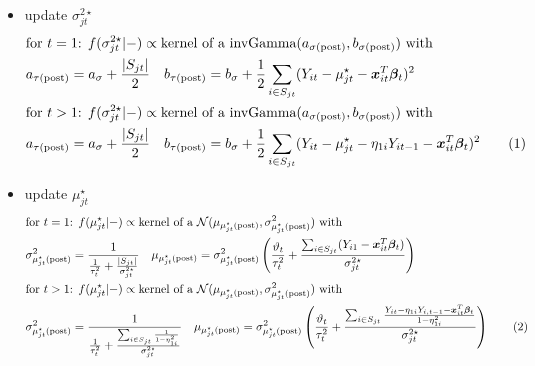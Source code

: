 \documentclass[12pt,	%
	a4paper,		%
	twoside,		%
	openright,		%
	titlepage,%
	]{book}
\newcommand\numberthis{\addtocounter{equation}{1}\tag{\theequation}}
\theoremstyle{definition}
\begin{document}
\begin{itemize}

\item update $\sigma^{2\star}_{jt}$
\begin{align*}
&\text{for $t=1$} \text{: }
  f(\sigma^{2\star}_{jt}|-)\propto \text{kernel of a $\invgamma(a_{\postp{\sigma}}, b_{\postp{\sigma}})$ with}\\
&a_{\postp{\tau}}= a_\sigma + \frac{|S_{jt}|}{2} \quad
%
b_{\postp{\tau}}=b_\sigma + \frac{1}{2}\sum_{i \in S_{jt}}(Y_{it}-\mu^\star_{jt}-\vec{x}_{it}^T\vec{\beta}_t)^2 \\
&\text{for $t>1$}\text{: }
  f(\sigma^{2\star}_{jt}|-) \propto \text{kernel of a $\invgamma(a_{\postp{\sigma}}, b_{\postp{\sigma}})$ with}\\
&a_{\postp{\tau}}= a_\sigma + \frac{|S_{jt}|}{2} \quad
%
b_{\postp{\tau}}=b_\sigma + \frac{1}{2}\sum_{i \in S_{jt}}(Y_{it}-\mu^\star_{jt}-\eta_{1i}Y_{it-1}-\vec{x}_{it}^T\vec{\beta}_t)^2 
 \numberthis \label{update sigma2h}
\end{align*}


\item update $\mu^\star_{jt}$
\begin{align*}
&\text{for $t=1$} \text{: }
 f(\mu^\star_{jt}|-) \propto \text{kernel of a $\N(\mu_{\postp{\mu^\star_{jt}}},\sigma^2_{\postp{\mu^\star_{jt}}})$ with}\\
&\sigma^2_{\postp{\mu^\star_{jt}}}=\frac{1}{\frac{1}{\tau^2_t}+\frac{|S_{jt}|}{\sigma^{2\star}_{jt}}}\quad
%
\mu_{\postp{\mu^\star_{jt}}}=\sigma^2_{\postp{\mu^\star_{jt}}}\left( \frac{\theta_t}{\tau_t^2} + \frac{\sum_{i \in S_{jt}} (Y_{i1}-\vec{x}_{it}^T\vec{\beta}_t)}{\sigma^{2\star}_{jt}} \right)\\
&\text{for $t>1$} \text{: }
 f(\mu^\star_{jt}|-) \propto \text{kernel of a $\N(\mu_{\postp{\mu^\star_{jt}}},\sigma^2_{\postp{\mu^\star_{jt}}})$ with}\\
&\sigma^2_{\postp{\mu^\star_{jt}}}=\frac{1}{\frac{1}{\tau_t^2}+\frac{\sum_{i \in S_{jt}} \frac{1}{1-\eta_{1i}^2}}{\sigma^{2\star}_{jt}}}\quad
%
\mu_{\postp{\mu^\star_{jt}}}=\sigma^2_{\postp{\mu^\star_{jt}}}\left( \frac{\theta_t}{\tau_t^2} + \frac{\sum_{i \in S_{jt}} \frac{Y_{it}-\eta_{1i}Y_{i,t-1}-\vec{x}_{it}^T\vec{\beta}_t}{1-\eta_{1i}^2}}{\sigma_{jt}^{2\star}} \right)
 \numberthis \label{update muh}
\end{align*}



\end{itemize}
\end{document}
